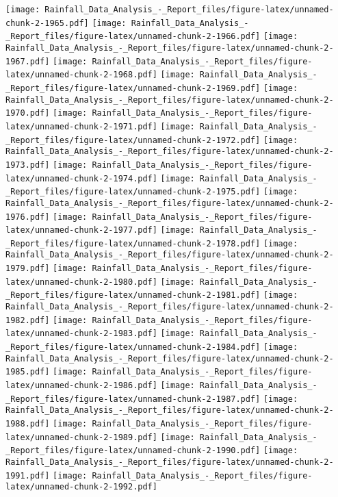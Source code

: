 \documentclass[
]{article}
\begin{document}
\texttt{[image: Rainfall\_Data\_Analysis\_-\_Report\_files/figure-latex/unnamed-chunk-2-1965.pdf]}
\texttt{[image: Rainfall\_Data\_Analysis\_-\_Report\_files/figure-latex/unnamed-chunk-2-1966.pdf]}
\texttt{[image: Rainfall\_Data\_Analysis\_-\_Report\_files/figure-latex/unnamed-chunk-2-1967.pdf]}
\texttt{[image: Rainfall\_Data\_Analysis\_-\_Report\_files/figure-latex/unnamed-chunk-2-1968.pdf]}
\texttt{[image: Rainfall\_Data\_Analysis\_-\_Report\_files/figure-latex/unnamed-chunk-2-1969.pdf]}
\texttt{[image: Rainfall\_Data\_Analysis\_-\_Report\_files/figure-latex/unnamed-chunk-2-1970.pdf]}
\texttt{[image: Rainfall\_Data\_Analysis\_-\_Report\_files/figure-latex/unnamed-chunk-2-1971.pdf]}
\texttt{[image: Rainfall\_Data\_Analysis\_-\_Report\_files/figure-latex/unnamed-chunk-2-1972.pdf]}
\texttt{[image: Rainfall\_Data\_Analysis\_-\_Report\_files/figure-latex/unnamed-chunk-2-1973.pdf]}
\texttt{[image: Rainfall\_Data\_Analysis\_-\_Report\_files/figure-latex/unnamed-chunk-2-1974.pdf]}
\texttt{[image: Rainfall\_Data\_Analysis\_-\_Report\_files/figure-latex/unnamed-chunk-2-1975.pdf]}
\texttt{[image: Rainfall\_Data\_Analysis\_-\_Report\_files/figure-latex/unnamed-chunk-2-1976.pdf]}
\texttt{[image: Rainfall\_Data\_Analysis\_-\_Report\_files/figure-latex/unnamed-chunk-2-1977.pdf]}
\texttt{[image: Rainfall\_Data\_Analysis\_-\_Report\_files/figure-latex/unnamed-chunk-2-1978.pdf]}
\texttt{[image: Rainfall\_Data\_Analysis\_-\_Report\_files/figure-latex/unnamed-chunk-2-1979.pdf]}
\texttt{[image: Rainfall\_Data\_Analysis\_-\_Report\_files/figure-latex/unnamed-chunk-2-1980.pdf]}
\texttt{[image: Rainfall\_Data\_Analysis\_-\_Report\_files/figure-latex/unnamed-chunk-2-1981.pdf]}
\texttt{[image: Rainfall\_Data\_Analysis\_-\_Report\_files/figure-latex/unnamed-chunk-2-1982.pdf]}
\texttt{[image: Rainfall\_Data\_Analysis\_-\_Report\_files/figure-latex/unnamed-chunk-2-1983.pdf]}
\texttt{[image: Rainfall\_Data\_Analysis\_-\_Report\_files/figure-latex/unnamed-chunk-2-1984.pdf]}
\texttt{[image: Rainfall\_Data\_Analysis\_-\_Report\_files/figure-latex/unnamed-chunk-2-1985.pdf]}
\texttt{[image: Rainfall\_Data\_Analysis\_-\_Report\_files/figure-latex/unnamed-chunk-2-1986.pdf]}
\texttt{[image: Rainfall\_Data\_Analysis\_-\_Report\_files/figure-latex/unnamed-chunk-2-1987.pdf]}
\texttt{[image: Rainfall\_Data\_Analysis\_-\_Report\_files/figure-latex/unnamed-chunk-2-1988.pdf]}
\texttt{[image: Rainfall\_Data\_Analysis\_-\_Report\_files/figure-latex/unnamed-chunk-2-1989.pdf]}
\texttt{[image: Rainfall\_Data\_Analysis\_-\_Report\_files/figure-latex/unnamed-chunk-2-1990.pdf]}
\texttt{[image: Rainfall\_Data\_Analysis\_-\_Report\_files/figure-latex/unnamed-chunk-2-1991.pdf]}
\texttt{[image: Rainfall\_Data\_Analysis\_-\_Report\_files/figure-latex/unnamed-chunk-2-1992.pdf]}
\end{document}
